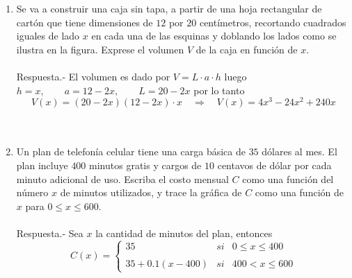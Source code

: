\begin{enumerate}
    \item Se va a construir una caja sin tapa, a partir de una hoja rectangular de cartón que tiene dimensiones de $12$ por $20$ centímetros, recortando cuadrados iguales de lado $x$ en cada una de las esquinas y doblando los lados como se ilustra en la figura. Exprese el volumen $V$ de la caja en función de $x$.\\\\
	Respuesta.-\; El volumen es dado por $V=L\cdot a\cdot h$ luego $h=x,\qquad a=12-2x, \qquad L=20-2x$ por lo tanto $$V(x)=(20-2x)(12-2x)\cdot x \quad \Longrightarrow \quad V(x)=4x^3 - 24x^2 + 240x$$\\\\

    \item Un plan de telefonía celular tiene una carga básica de $35$ dólares al mes. El plan incluye $400$ minutos gratis y cargos de $10$ centavos de dólar por cada minuto adicional de uso. Escriba el costo mensual $C$ como una función del número $x$ de minutos utilizados, y trace la gráfica de $C$ como una función de $x$ para $0 \leq x \leq 600$.\\\\
	Respuesta.-\; Sea $x$ la cantidad de minutos del plan, entonces 
	    $$C(x)=\left\{\begin{array}{llc}
		35&si&0\leq x\leq 400\\ 
		\\ 35+0.1(x-400)& si &400<x\leq 600
		\end{array}\right.$$
    

\end{enumerate}
